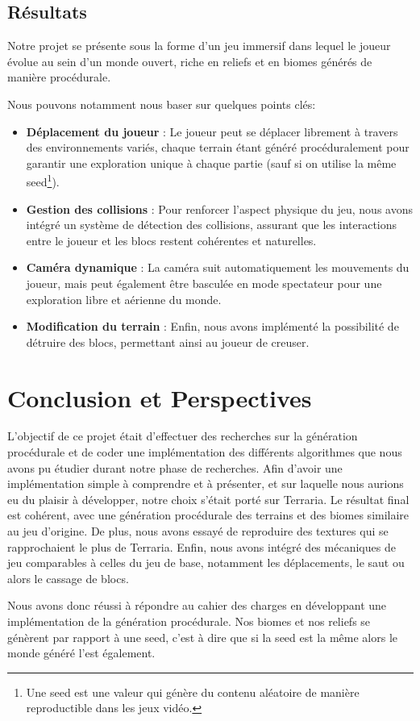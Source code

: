 \documentclass[12pt]{article}
\begin{document}
\subsection{Résultats}
Notre projet se présente sous la forme d’un jeu immersif dans lequel le joueur évolue au sein d’un monde ouvert, riche en reliefs et en biomes générés de manière procédurale.
\par
\vspace{0.3cm}
Nous pouvons notamment nous baser sur quelques points clés:\par
\vspace{0.3cm}
\begin{itemize}[label=\textbullet]
  \item 	\textbf{Déplacement du joueur} : Le joueur peut se déplacer librement à travers des environnements variés, chaque terrain étant généré procéduralement pour garantir une exploration unique à chaque partie (sauf si on utilise la même seed\footnote{Une seed est une valeur qui génère du contenu aléatoire de manière reproductible dans les jeux vidéo.}).
  \item \textbf{Gestion des collisions} : Pour renforcer l’aspect physique du jeu, nous avons intégré un système de détection des collisions, assurant que les interactions entre le joueur et les blocs restent cohérentes et naturelles.
  \item \textbf{Caméra dynamique} : La caméra suit automatiquement les mouvements du joueur, mais peut également être basculée en mode spectateur pour une exploration libre et aérienne du monde.
  \item \textbf{Modification du terrain} : Enfin, nous avons implémenté la possibilité de détruire des blocs, permettant ainsi au joueur de creuser.
\end{itemize}


\newpage
{}
\section{Conclusion et Perspectives}

L'objectif de ce projet était d'effectuer des recherches sur la génération procédurale et de coder une implémentation des différents algorithmes que nous avons pu étudier durant notre phase de recherches. Afin d'avoir une implémentation simple à comprendre et à présenter, et sur laquelle nous aurions eu du plaisir à développer, notre choix s'était porté sur Terraria. Le résultat final est cohérent, avec une génération procédurale des terrains et des biomes similaire au jeu d'origine. De plus, nous avons essayé de reproduire des textures qui se rapprochaient le plus de Terraria. Enfin, nous avons intégré des mécaniques de jeu comparables à celles du jeu de base, notamment les déplacements, le saut ou alors le cassage de blocs.\par
Nous avons donc réussi à répondre au cahier des charges en développant une implémentation de la génération procédurale. Nos biomes et nos reliefs se génèrent par rapport à une seed, c'est à dire que si la seed est la même alors le monde généré l'est également. 
\end{document}
